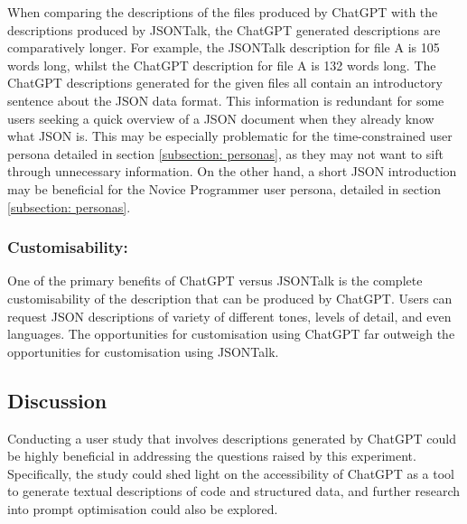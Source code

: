 \documentclass{l4proj}
\begin{document}
When comparing the descriptions of the files produced by ChatGPT with the descriptions produced by JSONTalk, the ChatGPT generated descriptions are comparatively longer. For example, the JSONTalk description for file A is 105 words long, whilst the ChatGPT description for file A is 132 words long. The ChatGPT descriptions generated for the given files all contain an introductory sentence about the JSON data format. This information is redundant for some users seeking a quick overview of a JSON document when they already know what JSON is. This may be especially problematic for the time-constrained user persona detailed in section \ref{subsection: personas}, as they may not want to sift through unnecessary information. On the other hand, a short JSON introduction may be beneficial for the Novice Programmer user persona, detailed in section \ref{subsection: personas}. 

\subsubsection{Customisability:} One of the primary benefits of ChatGPT versus JSONTalk is the complete customisability of the description that can be produced by ChatGPT. Users can request JSON descriptions of variety of different tones, levels of detail, and even languages. The opportunities for customisation using ChatGPT far outweigh the opportunities for customisation using JSONTalk. 

\subsection{Discussion}


Conducting a user study that involves descriptions generated by ChatGPT could be highly beneficial in addressing the questions raised by this experiment. Specifically, the study could shed light on the accessibility of ChatGPT as a tool to generate textual descriptions of code and structured data, and further research into prompt optimisation could also be explored.
\end{document}
